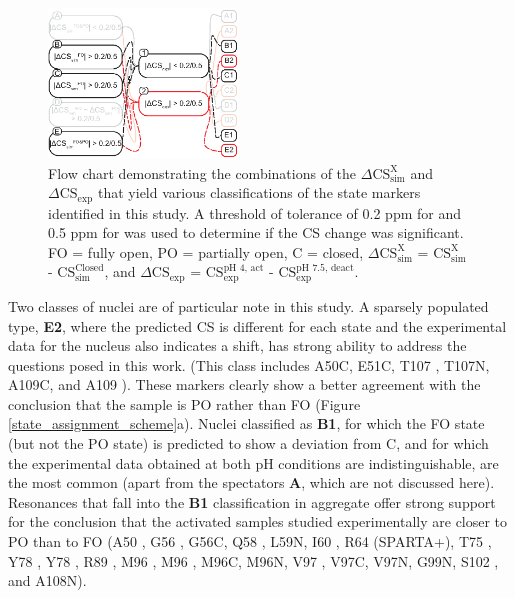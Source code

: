 \documentclass[%
 aip,
 amsmath,amssymb,
 preprint,%
]{revtex4-1}
\newcommand{\ca}{\ce{C_\alpha} }
\newcommand{\cb}{\ce{C_\beta} }
\begin{document}
\begin{figure}[tbp]
\includegraphics[width=0.45\textwidth]{figures/Markers_FlowChart_v4-02.eps}
\caption{\label{FlowChart} \scriptsize
    Flow chart demonstrating the combinations of the $\Delta\text{CS}_{\text{sim}}^{\text{X}}$ and $\Delta\text{CS}_{\text{exp}}$ that yield various classifications of the state markers identified in this study. A threshold of tolerance of 0.2 ppm for  and 0.5 ppm for  was used to determine if the CS change was significant. FO = fully open, PO = partially open, C = closed, $\Delta\text{CS}_{\text{sim}}^{\text{X}}$ = $\text{CS}_{\text{sim}}^{\text{X}}$ - $\text{CS}_{\text{sim}}^{\text{Closed}}$, and $\Delta\text{CS}_{\text{exp}}$ = $\text{CS}_{\text{exp}}^{\text{pH } 4\text{, act}}$ - $\text{CS}_{\text{exp}}^{\text{pH } 7.5\text{, deact}}$.}
\end{figure}

Two classes of nuclei are of particular note in this study. A sparsely populated type, \textbf{E2}, where the predicted CS is different for each state and the experimental data for the nucleus also indicates a shift, has strong ability to address the questions posed in this work. (This class includes A50C, E51C, T107\ca, T107N, A109C, and A109\cb). These markers clearly show a  better agreement with the conclusion that the sample is PO rather than FO (Figure \ref{state_assignment_scheme}a). Nuclei classified as \textbf{B1}, for which the FO state (but not the PO state) is predicted to show a deviation from C, and for which the experimental data obtained at both pH conditions are indistinguishable, are the most common (apart from the spectators \textbf{A}, which are not discussed here). Resonances that fall into the \textbf{B1} classification in aggregate offer strong support for the conclusion that the activated samples studied experimentally are closer to PO than to FO (A50\ca, G56\ca, G56C, Q58\ca, L59N, I60\cb, R64\cb (SPARTA+), T75\ca, Y78\ca, Y78\cb, R89\ca, M96\ca, M96\cb, M96C, M96N, V97\cb, V97C, V97N, G99N, S102\ca, and A108N).
 
\end{document}
